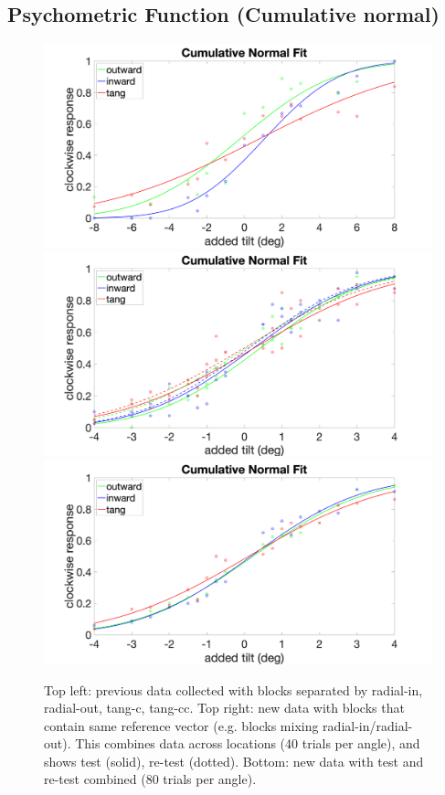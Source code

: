 \documentclass[11pt]{article} %
\begin{document}
\subsection{Psychometric Function (Cumulative normal)}
\begin{figure}[H]
\centering %
\includegraphics[scale=.08]{Images/PF_angles_old.png}
\includegraphics[scale=.08]{Images/PF_overlayed.png}
\includegraphics[scale=.08]{Images/PF_combined.png}
\caption{Top left: previous data collected with blocks separated by radial-in, radial-out, tang-c, tang-cc. Top right: new data with blocks that contain same reference vector (e.g. blocks mixing radial-in/radial-out). This combines data across locations (40 trials per angle), and shows test (solid), re-test (dotted). Bottom: new data with test and re-test combined (80 trials per angle).}
\end{figure}
\end{document}
